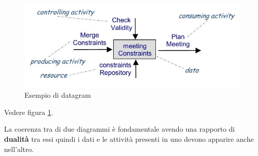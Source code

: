 \documentclass[a4paper,12pt, oneside]{book}
\begin{document}
\begin{enumerate}
  \begin{figure}
    \centering
    \includegraphics[scale = 0.5]{img/dgram.jpg}
    \caption{Esempio di datagram}
    \label{fig:dgram}
  \end{figure}
  Vedere figura \ref{fig:dgram}.
\end{enumerate}
La coerenza tra di due diagrammi è fondamentale avendo una rapporto di
\textbf{dualità} tra essi quindi i dati e le attività presenti in uno devono
apparire anche nell'altro.
\end{document}
